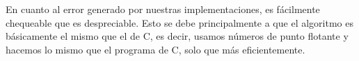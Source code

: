 En cuanto al error generado por nuestras implementaciones, es fácilmente chequeable que es despreciable. Esto se debe principalmente a que el algoritmo es básicamente el mismo que el de C, es decir, usamos números de punto flotante y hacemos lo mismo que el programa de C, solo que más eficientemente.














